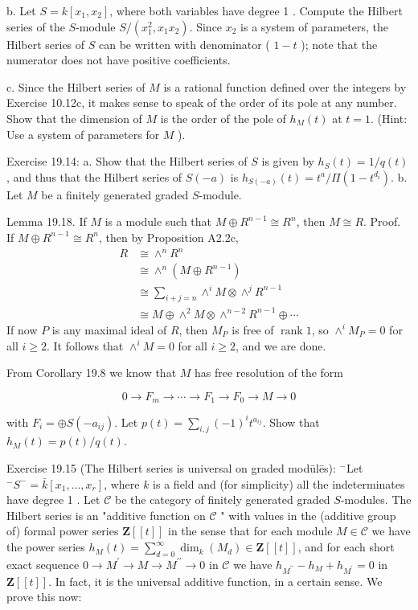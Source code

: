 \documentclass[10pt, letterpaper]{article}
\begin{document}
b. Let $S=k\left[x_1, x_2\right]$, where both variables have degree 1 . Compute the Hilbert series of the $S$-module $S /\left(x_1^2, x_1 x_2\right)$. Since $x_2$ is a system of parameters, the Hilbert series of $S$ can be written with denominator ( $1-t$ ); note that the numerator does not have positive coefficients.

c. Since the Hilbert series of $M$ is a rational function defined over the integers by Exercise 10.12c, it makes sense to speak of the order of its pole at any number. Show that the dimension of $M$ is the order of the pole of $h_M(t)$ at $t=1$. (Hint: Use a system of parameters for $M$ ).

Exercise 19.14:
a. Show that the Hilbert series of $S$ is given by $h_S(t)=1 / q(t)$, and thus that the Hilbert series of $S(-a)$ is $h_{S(-a)}(t)=t^a / \Pi\left(1-t^{d_i}\right)$.
b. Let $M$ be a finitely generated graded $S$-module. 

Lemma 19.18. If $M$ is a module such that $M \oplus R^{n-1} \cong R^n$, then $M \cong R$.
Proof. If $M \oplus R^{n-1} \cong R^n$, then by Proposition A2.2c,
$$
\begin{aligned}
R & \cong \wedge^n R^n \\
& \cong \wedge^n\left(M \oplus R^{n-1}\right) \\
& \cong \sum_{i+j=n} \wedge^i M \otimes \wedge^j R^{n-1} \\
& \cong M \oplus \wedge^2 M \otimes \wedge^{n-2} R^{n-1} \oplus \cdots
\end{aligned}
$$
If now $P$ is any maximal ideal of $R$, then $M_P$ is free of $\operatorname{rank} 1$, so $\wedge^i M_P=0$ for all $i \geq 2$. It follows that $\wedge^i M=0$ for all $i \geq 2$, and we are done.

From Corollary 19.8 we know that $M$ has free resolution of the form

$$
0 \rightarrow F_m \rightarrow \cdots \rightarrow F_1 \rightarrow F_0 \rightarrow M \rightarrow 0
$$

with $F_i=\oplus S\left(-a_{i j}\right)$. Let $p(t)=\sum_{i, j}(-1)^i t^{a_{i j}}$. Show that $h_M(t)= p(t) / q(t)$.

Exercise 19.15 (The Hilbert series is universal on graded modūlēs): ${ }^{-}$Let ${ }^{-} S^{-}=\bar{k}\left[x_1, \ldots, x_r\right]$, where $k$ is a field and (for simplicity) all the indeterminates have degree 1 . Let $\mathcal{C}$ be the category of finitely generated graded $S$-modules. The Hilbert series is an "additive function on $\mathcal{C}$ " with values in the (additive group of) formal power series $\mathbf{Z}[[t]]$ in the sense that for each module $M \in \mathcal{C}$ we have the power series $h_M(t)=\sum_{d=0}^{\infty} \operatorname{dim}_k\left(M_d\right) \in \mathbf{Z}[[t]]$, and for each short exact sequence $0 \rightarrow M^{\prime} \rightarrow M \rightarrow M^{\prime \prime} \rightarrow 0$ in $\mathcal{C}$ we have $h_{M^{\prime \prime}}-h_M+h_{M^{\prime}}=0$ in $\mathbf{Z}[[t]]$. In fact, it is the universal additive function, in a certain sense. We prove this now:
\end{document}
